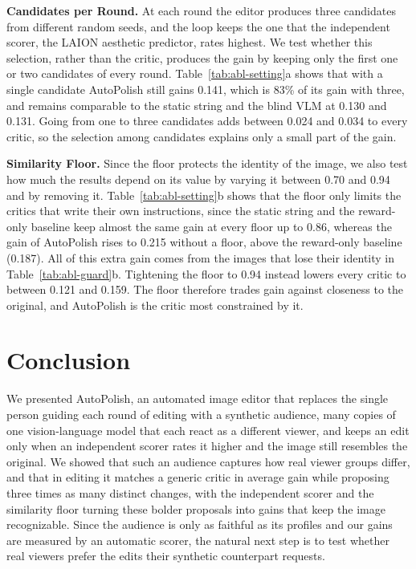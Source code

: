 \documentclass[runningheads]{llncs}
\begin{document}
\textbf{Candidates per Round.} At each round the editor produces three candidates from different random seeds, and the loop keeps the one that the independent scorer, the LAION aesthetic predictor, rates highest. We test whether this selection, rather than the critic, produces the gain by keeping only the first one or two candidates of every round. Table~\ref{tab:abl-setting}a shows that with a single candidate AutoPolish still gains 0.141, which is 83\% of its gain with three, and remains comparable to the static string and the blind VLM at 0.130 and 0.131. Going from one to three candidates adds between 0.024 and 0.034 to every critic, so the selection among candidates explains only a small part of the gain.

\textbf{Similarity Floor.} Since the floor protects the identity of the image, we also test how much the results depend on its value by varying it between 0.70 and 0.94 and by removing it. Table~\ref{tab:abl-setting}b shows that the floor only limits the critics that write their own instructions, since the static string and the reward-only baseline keep almost the same gain at every floor up to 0.86, whereas the gain of AutoPolish rises to 0.215 without a floor, above the reward-only baseline (0.187). All of this extra gain comes from the images that lose their identity in Table~\ref{tab:abl-guard}b. Tightening the floor to 0.94 instead lowers every critic to between 0.121 and 0.159. The floor therefore trades gain against closeness to the original, and AutoPolish is the critic most constrained by it.

\section{Conclusion}

We presented AutoPolish, an automated image editor that replaces the single person guiding each round of editing with a synthetic audience, many copies of one vision-language model that each react as a different viewer, and keeps an edit only when an independent scorer rates it higher and the image still resembles the original. We showed that such an audience captures how real viewer groups differ, and that in editing it matches a generic critic in average gain while proposing three times as many distinct changes, with the independent scorer and the similarity floor turning these bolder proposals into gains that keep the image recognizable. Since the audience is only as faithful as its profiles and our gains are measured by an automatic scorer, the natural next step is to test whether real viewers prefer the edits their synthetic counterpart requests.
\end{document}
